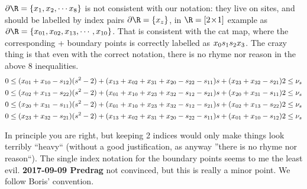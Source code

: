 \begin{description}
 {
$\partial\R=\{\ssp_{1}, \ssp_{2},  \cdots \ssp_{8}\}$ is not consistent with
our notation: they live on sites, and should be labelled by index pairs
$\partial\R=\{\ssp_{z}\}$, in $\R = [2\!\times\!1]$ example as
$\partial\R=\{\ssp_{01}, \ssp_{02}, \ssp_{13},\cdots, \ssp_{10}\}$. That is
consistent with the cat map, where the corresponding {\brick} + boundary
points is correctly labelled as $x_{0}{s_{1}} {s_{2}}x_{3}$. The
crazy thing is that even with the correct notation, there is no rhyme nor
reason in the above 8 inequalities.
{\scriptsize
\begin{eqnarray*}
 0 \leq  (x_{01} +x_{10}-{s_{12}})(s^2-2)+(x_{13}+x_{02}+x_{31}+x_{20}-{s_{22}}-{s_{11}})s +(x_{23}+x_{32}-{s_{21}})2\leq\nu_s\nonumber\\
 0 \leq (x_{02} +x_{13}-{s_{22}})(s^2-2)+(x_{01}+x_{10}+x_{23}+x_{32}-{s_{12}}-{s_{21}})s +(x_{20}+x_{31} -{s_{11}} )2\leq\nu_s\nonumber\\
 0\leq   (x_{20} +x_{31}- {s_{11}})(s^2-2)+(x_{01}+x_{10}+x_{23}+x_{32} -{s_{12}}-{s_{21}})s  +(x_{02}+x_{13}-{s_{22}})2\leq\nu_s\nonumber\\
 0\leq (x_{23} +x_{32} -{s_{21}})(s^2-2)+(x_{13}+x_{02}+x_{31}+x_{20} - {s_{22}}-{s_{11}} )s+(x_{01}+x_{10} -{s_{12}})2\leq\nu_s
\end{eqnarray*}
}
    }

{In principle you are right, but keeping 2 indices would only make things
look terribly  ``heavy`` (without a good justification, as anyway ''there
is no rhyme nor reason``). The single index notation for the boundary
points seems to me the least evil. {\bf 2017-09-09 Predrag} not
convinced, but this is really a minor point. We follow Boris'
convention.}

\end{description}
